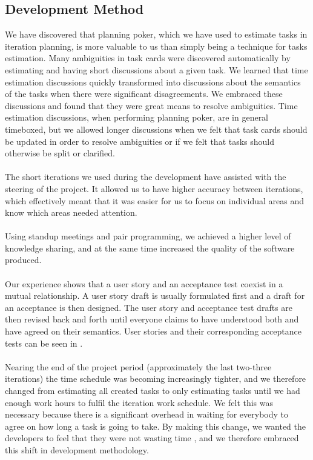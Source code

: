 
\subsection{Development Method}
We have discovered that planning poker, which we have used to estimate tasks in iteration planning, is more valuable to us than simply being a technique for tasks estimation. Many ambiguities in task cards were discovered automatically by estimating and having short discussions about a given task. We learned that time estimation discussions quickly transformed into discussions about the semantics of the tasks when there were significant disagreements. We embraced these discussions and found that they were great means to resolve ambiguities. Time estimation discussions, when performing planning poker, are in general timeboxed, but we allowed longer discussions when we felt that task cards should be updated in order to resolve ambiguities or if we felt that tasks should otherwise be split or clarified.
\\\\
The short iterations we used during the development have assisted with the steering of the project. It allowed us to have higher accuracy between iterations, which effectively meant that it was easier for us to focus on individual areas and know which areas needed attention. 
\\\\
Using standup meetings and pair programming, we achieved a higher level of knowledge sharing, and at the same time increased the quality of the software produced. 
\\\\
Our experience shows that a user story and an acceptance test coexist in a mutual relationship. A user story draft is usually formulated first and a draft for an acceptance is then designed. The user story and acceptance test drafts are then revised back and forth until everyone claims to have understood both and have agreed on their semantics. User stories and their corresponding acceptance tests can be seen in .
\\\\
Nearing the end of the project period (approximately the last two-three iterations) the time schedule was becoming increasingly tighter, and we therefore changed from estimating all created tasks to only estimating tasks until we had enough work hours to fulfil the iteration work schedule. We felt this was necessary because there is a significant overhead in waiting for everybody to agree on how long a task is going to take. By making this change, we wanted the developers to feel that they were not wasting time , and we therefore embraced this shift in development methodology.
